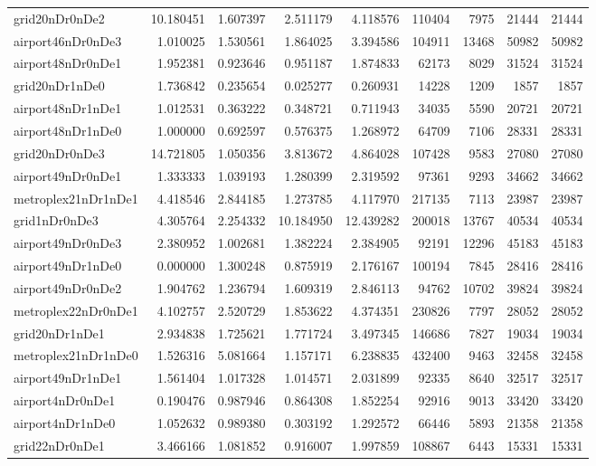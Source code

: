 \begin{longtable}{|l|r|r|r|r|r|r|r|r|}
grid20nDr0nDe2 & 10.180451 & 1.607397 & 2.511179 & 4.118576 & 110404 & 7975 & 21444 & 21444 \\
airport46nDr0nDe3 & 1.010025 & 1.530561 & 1.864025 & 3.394586 & 104911 & 13468 & 50982 & 50982 \\
airport48nDr0nDe1 & 1.952381 & 0.923646 & 0.951187 & 1.874833 & 62173 & 8029 & 31524 & 31524 \\
grid20nDr1nDe0 & 1.736842 & 0.235654 & 0.025277 & 0.260931 & 14228 & 1209 & 1857 & 1857 \\
airport48nDr1nDe1 & 1.012531 & 0.363222 & 0.348721 & 0.711943 & 34035 & 5590 & 20721 & 20721 \\
airport48nDr1nDe0 & 1.000000 & 0.692597 & 0.576375 & 1.268972 & 64709 & 7106 & 28331 & 28331 \\
grid20nDr0nDe3 & 14.721805 & 1.050356 & 3.813672 & 4.864028 & 107428 & 9583 & 27080 & 27080 \\
airport49nDr0nDe1 & 1.333333 & 1.039193 & 1.280399 & 2.319592 & 97361 & 9293 & 34662 & 34662 \\
metroplex21nDr1nDe1 & 4.418546 & 2.844185 & 1.273785 & 4.117970 & 217135 & 7113 & 23987 & 23987 \\
grid1nDr0nDe3 & 4.305764 & 2.254332 & 10.184950 & 12.439282 & 200018 & 13767 & 40534 & 40534 \\
airport49nDr0nDe3 & 2.380952 & 1.002681 & 1.382224 & 2.384905 & 92191 & 12296 & 45183 & 45183 \\
airport49nDr1nDe0 & 0.000000 & 1.300248 & 0.875919 & 2.176167 & 100194 & 7845 & 28416 & 28416 \\
airport49nDr0nDe2 & 1.904762 & 1.236794 & 1.609319 & 2.846113 & 94762 & 10702 & 39824 & 39824 \\
metroplex22nDr0nDe1 & 4.102757 & 2.520729 & 1.853622 & 4.374351 & 230826 & 7797 & 28052 & 28052 \\
grid20nDr1nDe1 & 2.934838 & 1.725621 & 1.771724 & 3.497345 & 146686 & 7827 & 19034 & 19034 \\
metroplex21nDr1nDe0 & 1.526316 & 5.081664 & 1.157171 & 6.238835 & 432400 & 9463 & 32458 & 32458 \\
airport49nDr1nDe1 & 1.561404 & 1.017328 & 1.014571 & 2.031899 & 92335 & 8640 & 32517 & 32517 \\
airport4nDr0nDe1 & 0.190476 & 0.987946 & 0.864308 & 1.852254 & 92916 & 9013 & 33420 & 33420 \\
airport4nDr1nDe0 & 1.052632 & 0.989380 & 0.303192 & 1.292572 & 66446 & 5893 & 21358 & 21358 \\
grid22nDr0nDe1 & 3.466166 & 1.081852 & 0.916007 & 1.997859 & 108867 & 6443 & 15331 & 15331 \\

\end{longtable}
